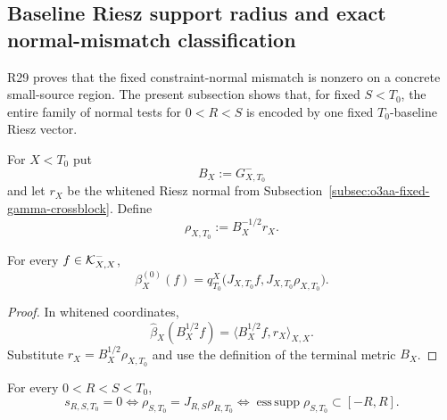 
\subsection{Baseline Riesz support radius and exact normal-mismatch classification}
\label{subsec:o3ac-riesz-support}

R29 proves that the fixed constraint-normal mismatch is nonzero on a concrete
small-source region.  The present subsection shows that, for fixed $S<T_0$, the entire
family of normal tests for $0<R<S$ is encoded by one fixed $T_0$-baseline Riesz vector.

For $X<T_0$ put
\[
 B_X:=G_{X,T_0}^-
\]
and let $r_X$ be the whitened Riesz normal from
Subsection~\ref{subsec:o3aa-fixed-gamma-crossblock}.  Define
\[
 \boxed{
 \rho_{X,T_0}:=B_X^{-1/2}r_X.
 }
\tag{O3AC.1}\label{eq:o3ac-rho}
\]

\begin{proposition}
\label{prop:o3ac-riesz}
For every $f\in\mathcal K_{X,X}^{-}$,
\[
 \boxed{
 \beta_X^{(0)}(f)
 =q_{T_0}^X
 \bigl(J_{X,T_0}f,J_{X,T_0}\rho_{X,T_0}\bigr).
 }
\tag{O3AC.2}\label{eq:o3ac-riesz-id}
\]
\end{proposition}

\begin{proof}
In whitened coordinates,
\[
 \widehat\beta_X(B_X^{1/2}f)
 =\langle B_X^{1/2}f,r_X\rangle_{X,X}.
\]
Substitute $r_X=B_X^{1/2}\rho_{X,T_0}$ and use the definition of the terminal metric
$B_X$.
\end{proof}

\begin{theorem}
\label{thm:o3ac-support-equivalence}
For every $0<R<S<T_0$,
\[
 \boxed{
 s_{R,S,T_0}=0
 \iff
 \rho_{S,T_0}=J_{R,S}\rho_{R,T_0}
 \iff
 \operatorname{ess\,supp}\rho_{S,T_0}\subset[-R,R].
 }
\tag{O3AC.3}\label{eq:o3ac-support-equivalence}
\]
\end{theorem}

